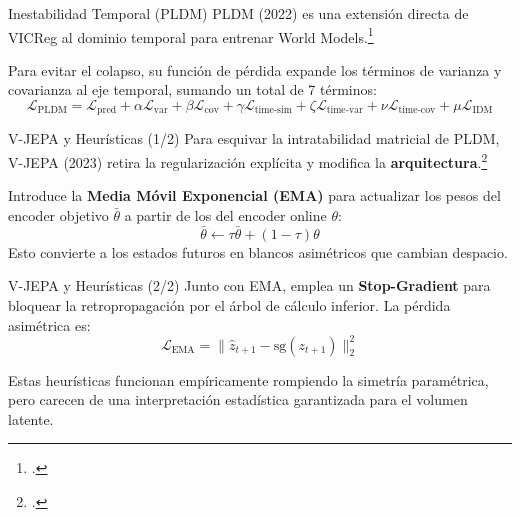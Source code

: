 \documentclass[aspectratio=169, 12pt]{beamer}
\begin{document}
\begin{frame}{Inestabilidad Temporal (PLDM)}
PLDM (2022) es una extensión directa de VICReg al dominio temporal para entrenar World Models.\footcite{sobal2022joint}

\vspace{0.5cm}
Para evitar el colapso, su función de pérdida expande los términos de varianza y covarianza al eje temporal, sumando un total de 7 términos:
\[
\mathcal{L}_{\text{PLDM}} = \mathcal{L}_{\text{pred}} + \alpha \mathcal{L}_{\text{var}} + \beta \mathcal{L}_{\text{cov}} + \gamma \mathcal{L}_{\text{time-sim}} + \zeta \mathcal{L}_{\text{time-var}} + \nu \mathcal{L}_{\text{time-cov}} + \mu \mathcal{L}_{\text{IDM}}
\]
\end{frame}

\begin{frame}{V-JEPA y Heurísticas (1/2)}
Para esquivar la intratabilidad matricial de PLDM, V-JEPA (2023) retira la regularización explícita y modifica la \textbf{arquitectura}.\footcite{assran2023self}

Introduce la \textbf{Media Móvil Exponencial (EMA)} para actualizar los pesos del encoder objetivo $\bar{\theta}$ a partir de los del encoder online $\theta$:
\[
    \bar{\theta} \leftarrow \tau\bar{\theta} + (1-\tau)\theta
\]
Esto convierte a los estados futuros en blancos asimétricos que cambian despacio.
\end{frame}

\begin{frame}{V-JEPA y Heurísticas (2/2)}
Junto con EMA, emplea un \textbf{Stop-Gradient} para bloquear la retropropagación por el árbol de cálculo inferior. La pérdida asimétrica es:
\[
    \mathcal{L}_{\text{EMA}} = \|\hat{z}_{t+1} - \text{sg}(z_{t+1})\|_2^2
\]

Estas heurísticas funcionan empíricamente rompiendo la simetría paramétrica, pero carecen de una interpretación estadística garantizada para el volumen latente.
\end{frame}
\end{document}
